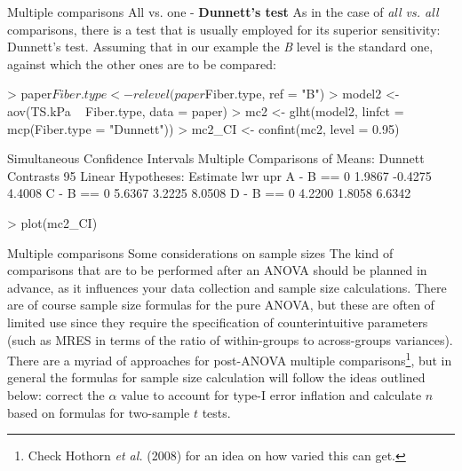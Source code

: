 \documentclass[t]{beamer}
\begin{document}
\begin{ftstf}
{Multiple comparisons}
{All vs. one - \textbf{Dunnett's test}}
As in the case of \textit{all vs. all} comparisons, there is a test that is usually employed for its superior sensitivity: Dunnett's test.
\vhalf
Assuming that in our example the \textit{B} level is the standard one, against which the other ones are to be compared:
\vhalf
\begin{rcode}
> paper$Fiber.type <- relevel(paper$Fiber.type, ref = "B")
> model2           <- aov(TS.kPa ~ Fiber.type, data = paper)
> mc2              <- glht(model2, linfct = mcp(Fiber.type = "Dunnett"))
> mc2_CI           <- confint(mc2, level = 0.95)

Simultaneous Confidence Intervals
Multiple Comparisons of Means: Dunnett Contrasts
95%
Linear Hypotheses:
Estimate lwr     upr    
A - B == 0  1.9867  -0.4275  4.4008
C - B == 0  5.6367   3.2225  8.0508
D - B == 0  4.2200   1.8058  6.6342

> plot(mc2_CI)
\end{rcode}
\end{ftstf}


\begin{ftst}
{Multiple comparisons}
{Some considerations on sample sizes}
The kind of comparisons that are to be performed after an ANOVA should be planned in advance, as it influences your data collection and sample size calculations. There are of course sample size formulas for the pure ANOVA, but these are often of limited use since they require the specification of counterintuitive parameters (such as MRES in terms of the ratio of within-groups to across-groups variances).
\vone
There are a myriad of approaches for post-ANOVA multiple comparisons\footnote[5]{\tiny Check Hothorn \textit{et al.} (2008) for an idea on how varied this can get.}, but in general the formulas for sample size calculation will follow the ideas outlined below: correct the $\alpha$ value to account for type-I error inflation and calculate $n$ based on formulas for two-sample $t$ tests. 
\end{ftst}
\end{document}
